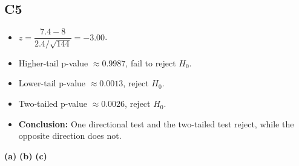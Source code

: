\subsection*{C5}
\begin{itemize}
    \item \(z=\dfrac{7.4-8}{2.4/\sqrt{144}}=-3.00\).
    \item Higher-tail p-value \(\approx0.9987\), fail to reject \(H_0\).
    \item Lower-tail p-value \(\approx0.0013\), reject \(H_0\).
    \item Two-tailed p-value \(\approx0.0026\), reject \(H_0\).
    \item \textbf{Conclusion:} One directional test and the two-tailed test reject, while the opposite direction does not.
\end{itemize}

\begin{center}
\textbf{(a)}\;
\hspace{0.5cm}
\textbf{(b)}\;
\hspace{0.5cm}
\textbf{(c)}\;
\end{center}


